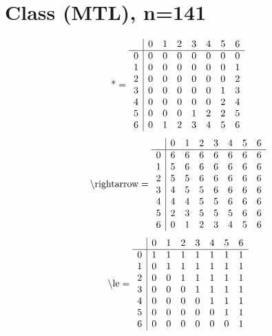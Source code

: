 \documentclass[11pt]{article}
\begin{document}
\section{Class (MTL), n=141}
\[\text{*} = 
\begin{array}{r | r r r r r r r}
 & 0 & 1 & 2 & 3 & 4 & 5 & 6 \\ \hline
0 & 0 & 0 & 0 & 0 & 0 & 0 & 0 \\
1 & 0 & 0 & 0 & 0 & 0 & 0 & 1 \\
2 & 0 & 0 & 0 & 0 & 0 & 0 & 2 \\
3 & 0 & 0 & 0 & 0 & 0 & 1 & 3 \\
4 & 0 & 0 & 0 & 0 & 0 & 2 & 4 \\
5 & 0 & 0 & 0 & 1 & 2 & 2 & 5 \\
6 & 0 & 1 & 2 & 3 & 4 & 5 & 6 \\
\end{array}
\]
\[\text{\textbackslash rightarrow} = 
\begin{array}{r | r r r r r r r}
 & 0 & 1 & 2 & 3 & 4 & 5 & 6 \\ \hline
0 & 6 & 6 & 6 & 6 & 6 & 6 & 6 \\
1 & 5 & 6 & 6 & 6 & 6 & 6 & 6 \\
2 & 5 & 5 & 6 & 6 & 6 & 6 & 6 \\
3 & 4 & 5 & 5 & 6 & 6 & 6 & 6 \\
4 & 4 & 4 & 5 & 5 & 6 & 6 & 6 \\
5 & 2 & 3 & 5 & 5 & 5 & 6 & 6 \\
6 & 0 & 1 & 2 & 3 & 4 & 5 & 6 \\
\end{array}
\]
\[\text{\textbackslash le} = 
\begin{array}{r | r r r r r r r}
 & 0 & 1 & 2 & 3 & 4 & 5 & 6 \\ \hline
0 & 1 & 1 & 1 & 1 & 1 & 1 & 1 \\
1 & 0 & 1 & 1 & 1 & 1 & 1 & 1 \\
2 & 0 & 0 & 1 & 1 & 1 & 1 & 1 \\
3 & 0 & 0 & 0 & 1 & 1 & 1 & 1 \\
4 & 0 & 0 & 0 & 0 & 1 & 1 & 1 \\
5 & 0 & 0 & 0 & 0 & 0 & 1 & 1 \\
6 & 0 & 0 & 0 & 0 & 0 & 0 & 1 \\
\end{array}
\]
\end{document}
